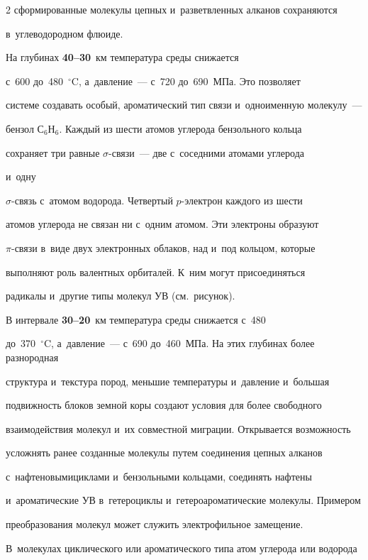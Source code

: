\begin{multicols}{2}
сформированные молекулы цепных и~разветвленных алканов сохраняются  

в~углеводородном флюиде.

    

    На глубинах \textbf{40--30}~км температура среды снижается 

с~600 до~480~$^\circ$C, а~давление~--- с~720 до~690~МПа. Это позволяет 

системе создавать особый, ароматический тип связи и~одноименную молекулу~--- 

бензол С$_6$Н$_6$. Каждый из шести атомов углерода бензольного кольца 

сохраняет три равные $\sigma$-свя\-зи~--- две с~соседними атомами углерода 

и~одну  

$\sigma$-связь с~атомом водорода. Четвертый $p$-элект\-рон каждого из шести 

атомов углерода не связан ни с~одним атомом. Эти электроны образуют  

$\pi$-свя\-зи в~виде двух электронных облаков, над и~под кольцом, которые 

выполняют роль валентных орбиталей. К~ним могут присоединяться 

радикалы и~другие типы молекул УВ (см.\ рисунок). 

    

    В интервале \textbf{30--20}~км температура среды снижается с~480 

    до~370~$^\circ$C, а~давление~--- с~690 до~460~МПа. На этих глубинах более разнородная 

структура и~текстура пород, меньшие температуры и~давление и~большая 

подвижность блоков земной коры создают условия для более свободного 

взаимодействия молекул и~их совместной миграции. Открывается возможность 

усложнять ранее созданные молекулы путем соединения цепных алканов 

с~нафтеновыми\linebreak циклами и~бензольными кольцами, соединять нафтены 

и~ароматические УВ в~гетероциклы и~гетероароматические молекулы. Примером 

преобразования молекул может служить электрофильное \mbox{замещение}. 

В~молекулах циклического или ароматического типа атом углерода или водорода 


\end{multicols}
